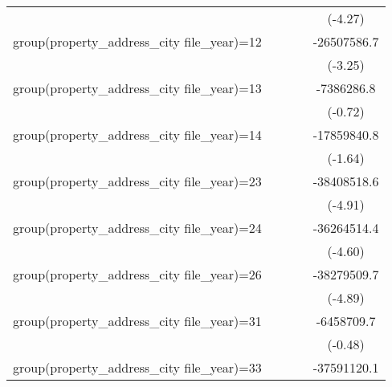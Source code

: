 {\begin{tabular}{l*{4}{c}}
                    &                     &                     &                     &     (-4.27)         \\
\addlinespace
group(property\_address\_city file\_year)=12&                     &                     &                     & -26507586.7\sym{**} \\
                    &                     &                     &                     &     (-3.25)         \\
\addlinespace
group(property\_address\_city file\_year)=13&                     &                     &                     &  -7386286.8         \\
                    &                     &                     &                     &     (-0.72)         \\
\addlinespace
group(property\_address\_city file\_year)=14&                     &                     &                     & -17859840.8         \\
                    &                     &                     &                     &     (-1.64)         \\
\addlinespace
group(property\_address\_city file\_year)=23&                     &                     &                     & -38408518.6\sym{***}\\
                    &                     &                     &                     &     (-4.91)         \\
\addlinespace
group(property\_address\_city file\_year)=24&                     &                     &                     & -36264514.4\sym{***}\\
                    &                     &                     &                     &     (-4.60)         \\
\addlinespace
group(property\_address\_city file\_year)=26&                     &                     &                     & -38279509.7\sym{***}\\
                    &                     &                     &                     &     (-4.89)         \\
\addlinespace
group(property\_address\_city file\_year)=31&                     &                     &                     &  -6458709.7         \\
                    &                     &                     &                     &     (-0.48)         \\
\addlinespace
group(property\_address\_city file\_year)=33&                     &                     &                     & -37591120.1\sym{***}\\

\end{tabular}}
